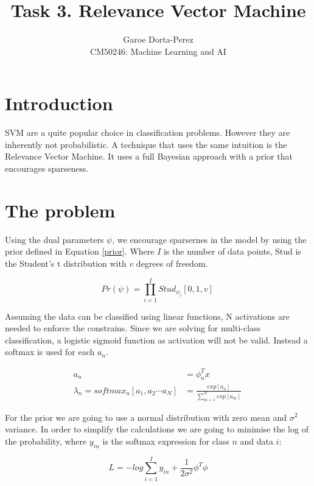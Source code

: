 \documentclass[12pt]{article}
\begin{document}
  
\title{Task 3. Relevance Vector Machine}
\author{Garoe Dorta-Perez\\
CM50246: Machine Learning and AI}
 
\maketitle
 
\section{Introduction}
 
SVM  are a quite popular choice in classification problems.
However they are inherently not probabilistic.
A technique that uses the same intuition is the Relevance Vector Machine.
It uses a full Bayesian approach with a prior that encourages sparseness.

\section{The problem}

Using the dual parameters $\psi$, we encourage sparsernes in the model by using the prior defined in Equation \ref{prior}.
Where $I$ is the number of data points, Stud is the Student's t distribution with $v$ degrees of freedom.

\begin{equation}
\label{prior}
Pr(\psi) = \prod_{i = 1}^{I} Stud_{\psi_i} [0, 1, v] \,
\end{equation}

Assuming the data can be classified using linear functions, N activations are needed to enforce the constrains.
Since we are solving for multi-class classification, a logistic sigmoid function as activation will not be valid.
Instead a softmax is used for each $a_{n}$.

\begin{align}
\label{activations}
a_{n} &= \phi_{n}^{T}x \\
\lambda_{n} = softmax_{n}[a_{1}, a_{2} \cdots a_{N}] &= 
\frac{exp[a_{n}]} {\sum_{m = 1}^{N} exp[a_{m}] }\,
\end{align}

For the prior we are going to use a normal distribution with zero mean and $\sigma^{2}$ variance.
In order to simplify the calculations we are going to minimise the log of the probability, where $y_{in}$ is the softmax expression for class $n$ and data $i$:

\begin{equation}
\label{L}
L = - log \sum_{i = 1}^{I} y_{in} + \frac{1}{2 \sigma^{2}} \phi^{T} \phi 
\end{equation}
\end{document}
